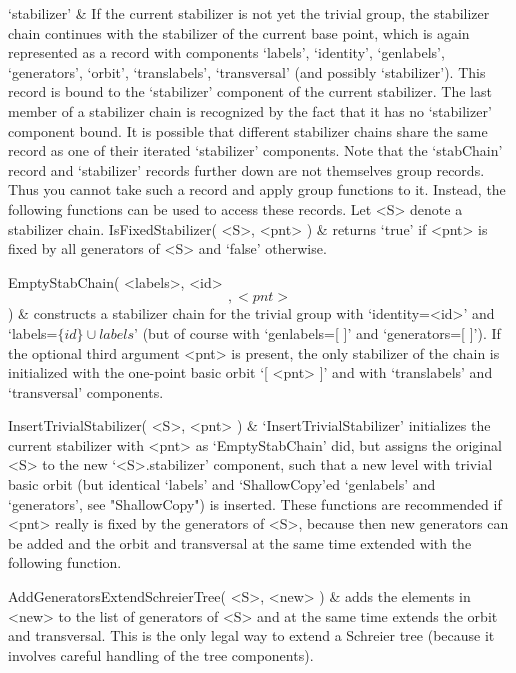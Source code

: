 `stabilizer' &
        If  the  current stabilizer is  not   yet the trivial  group, the
        stabilizer chain continues with   the stabilizer of  the  current
        base  point,  which is    again  represented as  a   record  with
        components `labels',    `identity',    `genlabels', `generators',
        `orbit',     `translabels',  `transversal'     (and      possibly
        `stabilizer'). This record is bound to the `stabilizer' component
        of the current stabilizer. The last member  of a stabilizer chain
        is recognized  by the fact that  it has no `stabilizer' component
        bound.
\enditems
It is possible that different stabilizer  chains share the same record as
one of their iterated `stabilizer' components.  Note that the `stabChain'
record and `stabilizer'  records further down   are not themselves  group
records. Thus you cannot take such a record and  apply group functions to
it. Instead, the following functions can be used to access these records.
Let <S> denote a stabilizer chain.
\beginitems
\function IsFixedStabilizer( <S>, <pnt> ) &
        returns `true'  if <pnt> is fixed by   all generators of  <S> and
        `false' otherwise.

\function EmptyStabChain( <labels>, <id> \[, <pnt> \] ) &
        constructs  a   stabilizer  chain  for   the trivial   group with
        `identity=<id>' and `labels=$\{id\}\cup  labels$'  (but of course
        with `genlabels=[ ]' and `generators=[ ]'). If the optional third
        argument <pnt>  is present, the only stabilizer   of the chain is
        initialized with the  one-point basic orbit  `[ <pnt> ]' and with
        `translabels' and `transversal' components.
        
\function InsertTrivialStabilizer( <S>, <pnt> ) &
        `InsertTrivialStabilizer' initializes the current stabilizer with
        <pnt> as `EmptyStabChain' did,   but assigns the original <S>  to
        the new `<S>.stabilizer'  component, such that  a new  level with
        trivial basic  orbit (but identical  `labels' and `ShallowCopy'ed
        `genlabels' and   `generators', see "ShallowCopy")  is  inserted.
        These functions are  recommended if <pnt> really  is fixed by the
        generators of  <S>, because then new  generators can be added and
        the  orbit  and transversal at  the same  time  extended with the
        following function.

\function AddGeneratorsExtendSchreierTree( <S>, <new> ) &
        adds the elements  in <new> to the list  of generators of <S> and
        at the  same time extends the  orbit and transversal. This is the
        only legal way  to extend  a  Schreier tree (because  it involves
        careful handling of the tree components).

